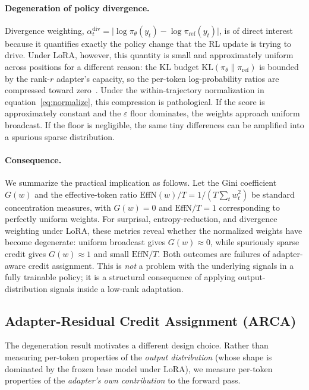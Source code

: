 \paragraph{Degeneration of policy divergence.}
Divergence weighting,
$\alpha_t^{\mathrm{div}} = \lvert \log \pi_\theta(y_t) - \log
\pi_{\mathrm{ref}}(y_t) \rvert$, is of direct interest because it quantifies
exactly the policy change that the RL update is trying to drive. Under LoRA,
however, this quantity is small and approximately uniform across positions for
a different reason: the KL budget $\mathrm{KL}(\pi_\theta \| \pi_{\mathrm{ref}})$
is bounded by the rank-$r$ adapter's capacity, so the per-token
log-probability ratios are compressed toward zero~\citep{anon2026implicitklra}.
Under the within-trajectory normalization in equation~\eqref{eq:normalize},
this compression is pathological. If the score is approximately constant and
the $\varepsilon$ floor dominates, the weights approach uniform broadcast. If
the floor is negligible, the same tiny differences can be amplified into a
spurious sparse distribution.

\paragraph{Consequence.}
We summarize the practical implication as follows. Let the Gini coefficient
$G(w)$ and the effective-token ratio $\mathrm{EffN}(w) / T = 1/(T \sum_t
w_t^2)$ be standard concentration measures, with $G(w) = 0$ and
$\mathrm{EffN}/T = 1$ corresponding to perfectly uniform weights. For
surprisal, entropy-reduction, and divergence weighting under LoRA, these
metrics reveal whether the normalized weights have become degenerate:
uniform broadcast gives $G(w)\approx0$, while spuriously sparse credit gives
$G(w)\approx1$ and small $\mathrm{EffN}/T$. Both outcomes are failures of
adapter-aware credit assignment. This is \emph{not} a problem with the
underlying signals in a fully trainable policy; it is a structural
consequence of applying output-distribution signals inside a low-rank
adaptation.

\subsection{Adapter-Residual Credit Assignment (ARCA)}\label{sec:arca}

The degeneration result motivates a different design choice. Rather than measuring
per-token properties of the \emph{output distribution} (whose shape is
dominated by the frozen base model under LoRA), we measure per-token
properties of the \emph{adapter's own contribution} to the forward pass.

